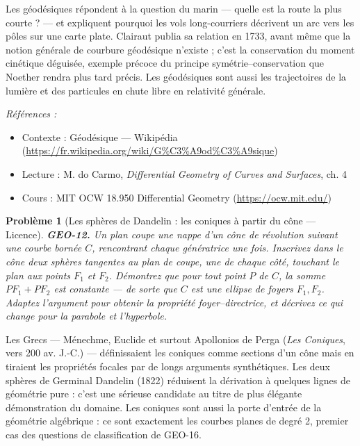 \documentclass[11pt]{article}
\newtheorem{problem}{Problème}
\newenvironment{refs}{\par\small\noindent\emph{Références :}\begin{itemize}\setlength\itemsep{0pt}}{\end{itemize}\normalsize}
\begin{document}
\noindent Les géodésiques répondent à la question du marin --- quelle est la route la plus
courte ? --- et expliquent pourquoi les vols long-courriers décrivent un arc vers les pôles sur une
carte plate. Clairaut publia sa relation en 1733, avant même que la notion générale de courbure
géodésique n'existe ; c'est la conservation du moment cinétique déguisée, exemple précoce du
principe symétrie--conservation que Noether rendra plus tard précis. Les géodésiques sont aussi les
trajectoires de la lumière et des particules en chute libre en relativité générale.

\begin{refs}
\item Contexte : Géodésique --- Wikipédia (\url{https://fr.wikipedia.org/wiki/G%C3%A9od%C3%A9sique})
\item Lecture : M. do Carmo, \textit{Differential Geometry of Curves and Surfaces}, ch. 4
\item Cours : MIT OCW 18.950 Differential Geometry (\url{https://ocw.mit.edu/})
\end{refs}

\bigskip

\begin{problem}[{Les sphères de Dandelin : les coniques à partir du cône --- Licence}]
\textbf{GEO-12.} Un plan coupe une nappe d'un cône de révolution suivant une
courbe bornée $ C $, rencontrant chaque génératrice une fois. Inscrivez dans le cône deux sphères
tangentes au plan de coupe, une de chaque côté, touchant le plan aux points $ F_1 $ et
$ F_2 $. Démontrez que pour tout point $ P $ de $ C $, la somme $ PF_1 + PF_2 $ est
constante --- de sorte que $ C $ est une ellipse de foyers $ F_1, F_2 $. Adaptez l'argument pour
obtenir la propriété foyer--directrice, et décrivez ce qui change pour la parabole et
l'hyperbole.
\end{problem}

\noindent Les Grecs --- Ménechme, Euclide et surtout Apollonios de Perga (\textit{Les Coniques},
vers 200 av. J.-C.) --- définissaient les coniques comme sections d'un cône mais en tiraient les
propriétés focales par de longs arguments synthétiques. Les deux sphères de Germinal Dandelin
(1822) réduisent la dérivation à quelques lignes de géométrie pure : c'est une sérieuse candidate
au titre de plus élégante démonstration du domaine. Les coniques sont aussi la porte d'entrée de la
géométrie algébrique : ce sont exactement les courbes planes de degré 2, premier cas des questions
de classification de GEO-16.
\end{document}
